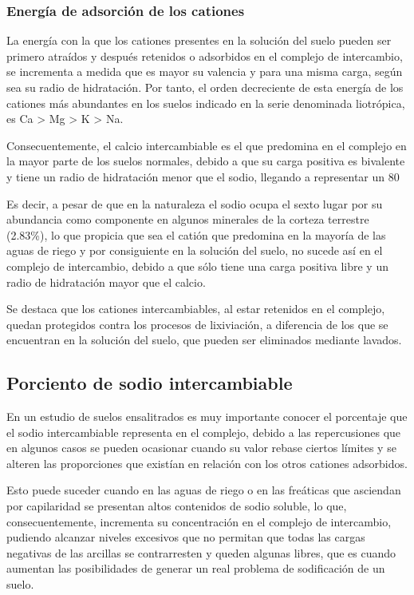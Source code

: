 \subsubsection{Energía de adsorción de los cationes}
La energía con la que los cationes presentes en la solución del suelo pueden ser primero atraídos y después retenidos o adsorbidos en el complejo de intercambio, se incrementa a medida que es mayor su valencia y para una misma carga, según sea su radio de hidratación. Por tanto, el orden decreciente de esta energía de los cationes más abundantes en los suelos indicado en la serie denominada liotrópica, es Ca > Mg > K > Na.

Consecuentemente, el calcio intercambiable es el que predomina en el complejo en la mayor parte de los suelos normales, debido a que su carga positiva es bivalente y tiene un radio de hidratación menor que el sodio, llegando a representar un 80%

Es decir, a pesar de que en la naturaleza el sodio ocupa el sexto lugar por su abundancia como componente en algunos minerales de la corteza terrestre (2.83\%), lo que propicia que sea el catión que predomina en la mayoría de las aguas de riego y por consiguiente en la solución del suelo, no sucede así en el complejo de intercambio, debido a que sólo tiene una carga positiva libre y un radio de hidratación mayor que el calcio.

Se destaca que los cationes intercambiables, al estar retenidos en el complejo, quedan protegidos contra los procesos de lixiviación, a diferencia de los que se encuentran en la solución del suelo, que pueden ser eliminados mediante lavados.

\subsection{Porciento de sodio intercambiable}
En un estudio de suelos ensalitrados es muy importante conocer el porcentaje que el sodio intercambiable representa en el complejo, debido a las repercusiones que en algunos casos se pueden ocasionar cuando su valor rebase ciertos límites y se alteren las proporciones que existían en relación con los otros cationes adsorbidos.

Esto puede suceder cuando en las aguas de riego o en las freáticas que asciendan por capilaridad se presentan altos contenidos de sodio soluble, lo que, consecuentemente, incrementa su concentración en el complejo de intercambio, pudiendo alcanzar niveles excesivos que no permitan que todas las cargas negativas de las arcillas se contrarresten y queden algunas libres, que es cuando aumentan las posibilidades de generar un real problema de sodificación de un suelo.

